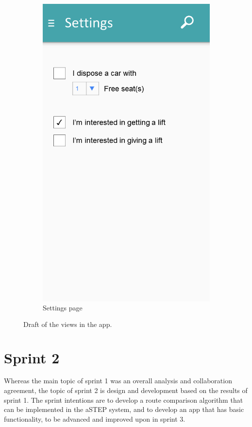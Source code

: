 \begin{figure}[h!]
\begin{subfigure}[b]{0.3\textwidth}
		\includegraphics[width=\textwidth]{figures/GUI-settings.png}
		\caption{Settings page}
		\label{fig:GUI-settings}
	\end{subfigure}
	\caption{Draft of the views in the app.}\label{fig:GUI-in-app}
\end{figure}


%
%

\chapter{Sprint 2}
Whereas the main topic of sprint 1 was an overall analysis and collaboration agreement, the topic of sprint 2 is design and development based on the results of sprint 1. The sprint intentions are to develop a route comparison algorithm that can be implemented in the aSTEP system, and to develop an app that has basic functionality, to be advanced and improved upon in sprint 3.

